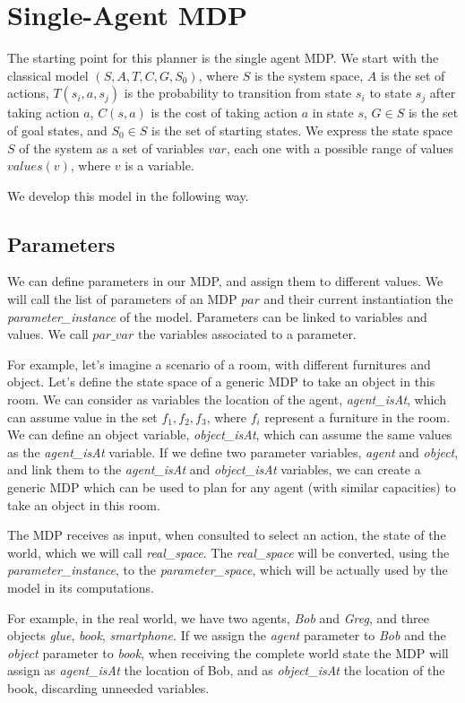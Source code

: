 \section{Single-Agent MDP}
The starting point for this planner is the single agent MDP. We start with the classical model $(S,A,T,C,G,S_0)$, where $S$ is the system space, $A$ is the set of actions, $T(s_i,a,s_j)$ is the probability to transition from state $s_i$ to state $s_j$ after taking action $a$, $C(s,a)$ is the cost of taking action $a$ in state $s$, $G \in S$ is the set of goal states, and $S_0 \in S$ is the set of starting states. We express the state space $S$ of the system as a set of variables $var$, each one with a possible range of values $values(v)$, where $v$ is a variable.

 We develop this model in the following way.

\subsection{Parameters}
We can define parameters in our MDP, and assign them to different values. We will call the list of parameters of an MDP $par$ and their current instantiation the \textit{parameter\_instance} of the model. Parameters can be linked to variables and values. We call $par\_var$ the variables associated to a parameter. 

For example, let's imagine a scenario of a room, with different furnitures and object. Let's define the state space of a generic MDP to take an object in this room. We can consider as variables the location of the agent, \textit{agent\_isAt}, which can assume value in the set ${f_1, f_2, f_3}$, where $f_i$ represent a furniture in the room. We can define an object variable, \textit{object\_isAt}, which can assume the same values as the \textit{agent\_isAt} variable. If we define two parameter variables, \textit{agent} and \textit{object}, and link them to the \textit{agent\_isAt} and \textit{object\_isAt} variables, we can create a generic MDP which can be used to plan for any agent (with similar capacities) to take an object in this room.

The MDP receives as input, when consulted to select an action, the state of the world,  which we will call \textit{real\_space}. The \textit{real\_space} will be converted, using the \textit{parameter\_instance}, to the \textit{parameter\_space}, which will be actually used by the model in its computations. 

For example, in the real world, we have two agents, \textit{Bob} and \textit{Greg}, and three objects \textit{glue}, \textit{book}, \textit{smartphone}. If we assign the \textit{agent} parameter to \textit{Bob} and the \textit{object} parameter to \textit{book}, when receiving the complete world state the MDP will assign as \textit{agent\_isAt} the location of Bob, and as \textit{object\_isAt} the location of the book, discarding unneeded variables.

